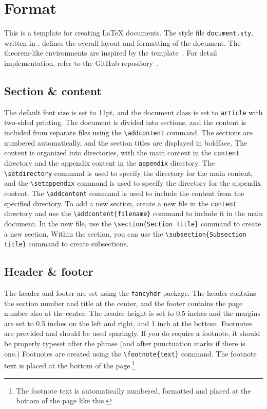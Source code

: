 \section{Format}

This is a template for creating \LaTeX{} documents. 
The style file \Verb|document.sty|, written in \LaTeXe{}, defines the overall layout and formatting of the document.
The theorem-like environments are inspired by the template~\autocite{sleepymalc2022template}.
For detail implementation, refer to the GitHub repository~\autocite{chang2025document}.

\subsection{Section \& content}

The default font size is set to 11pt, and the document class is set to \Verb|article| with two-sided printing.
The document is divided into sections, and the content is included from separate files using the \Verb|\addcontent| command.
The sections are numbered automatically, and the section titles are displayed in boldface.
The content is organized into directories, with the main content in the \Verb|content| directory and the appendix content in the \Verb|appendix| directory.
The \Verb|\setdirectory| command is used to specify the directory for the main content, and the \Verb|\setappendix| command is used to specify the directory for the appendix content.
The \Verb|\addcontent| command is used to include the content from the specified directory.
To add a new section, create a new file in the \Verb|content| directory and use the \Verb|\addcontent{filename}| command to include it in the main document.
In the new file, use the \Verb|\section{Section Title}| command to create a new section.
Within the section, you can use the \Verb|\subsection{Subsection title}| command to create subsections.

\subsection{Header \& footer}

The header and footer are set using the \Verb|fancyhdr| package.
The header contains the section number and title at the center, and the footer contains the page number also at the center.
The header height is set to 0.5 inches and the margins are set to 0.5 inches on the left and right, and 1 inch at the bottom.
Footnotes are provided and should be used sparingly. 
If you do require a footnote, it should be properly typeset after the phrase (and after punctuation marks if there is one.)
Footnotes are created using the \Verb|\footnote{text}| command. 
The footnote text is placed at the bottom of the page.\footnote{The footnote text is automatically numbered, formatted and placed at the bottom of the page like this.}


